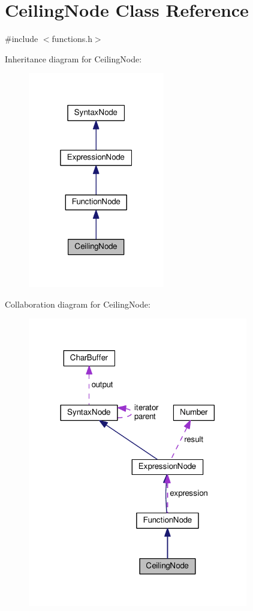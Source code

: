 \hypertarget{classCeilingNode}{}\section{Ceiling\+Node Class Reference}
\label{classCeilingNode}


{\ttfamily \#include $<$functions.\+h$>$}



Inheritance diagram for Ceiling\+Node\+:
\nopagebreak
\begin{figure}[H]
\begin{center}
\leavevmode
\includegraphics[width=169pt]{d1/d4b/classCeilingNode__inherit__graph}
\end{center}
\end{figure}


Collaboration diagram for Ceiling\+Node\+:
\nopagebreak
\begin{figure}[H]
\begin{center}
\leavevmode
\includegraphics[width=272pt]{d2/da7/classCeilingNode__coll__graph}
\end{center}
\end{figure}
